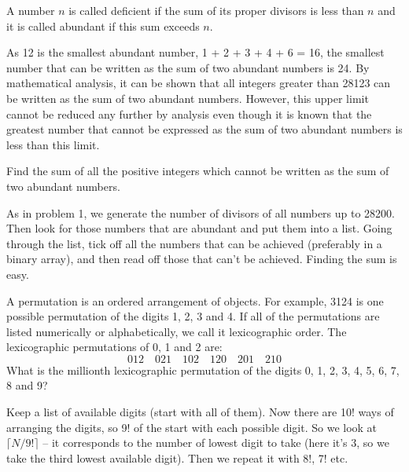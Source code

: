 A number $n$ is called deficient if the sum of its proper divisors is less than $n$ and it is called abundant if this sum exceeds $n$.

As 12 is the smallest abundant number, 1 + 2 + 3 + 4 + 6 = 16, the smallest number that can be written as the sum of two abundant numbers is 24. By mathematical analysis, it can be shown that all integers greater than 28123 can be written as the sum of two abundant numbers. However, this upper limit cannot be reduced any further by analysis even though it is known that the greatest number that cannot be expressed as the sum of two abundant numbers is less than this limit.

Find the sum of all the positive integers which cannot be written as the sum of two abundant numbers.

As in problem 1, we generate the number of divisors of all numbers up to 28200.  Then look for those numbers that are abundant
and put them into a list.  Going through the list, tick off all the numbers that can be achieved (preferably in a binary array), and then read off those that can't be achieved.  Finding the sum is easy.




A permutation is an ordered arrangement of objects. For example, 3124 is one possible permutation of the digits 1, 2, 3 and 4. If all of the permutations are listed numerically or alphabetically, we call it lexicographic order. The lexicographic permutations of 0, 1 and 2 are:
$$012 \quad  021 \quad    102   \quad  120   \quad  201   \quad  210$$
What is the millionth lexicographic permutation of the digits 0, 1, 2, 3, 4, 5, 6, 7, 8 and 9?

 Keep a list of available digits (start with all of them).  Now there are 10! ways
of arranging the digits, so 9! of the start with each possible digit.  So we look at $\lceil N/9! \rceil$ -- it corresponds
to the number of lowest digit to take (here it's 3, so we take the third lowest available digit).  Then we repeat it with 8!, 7! etc.






